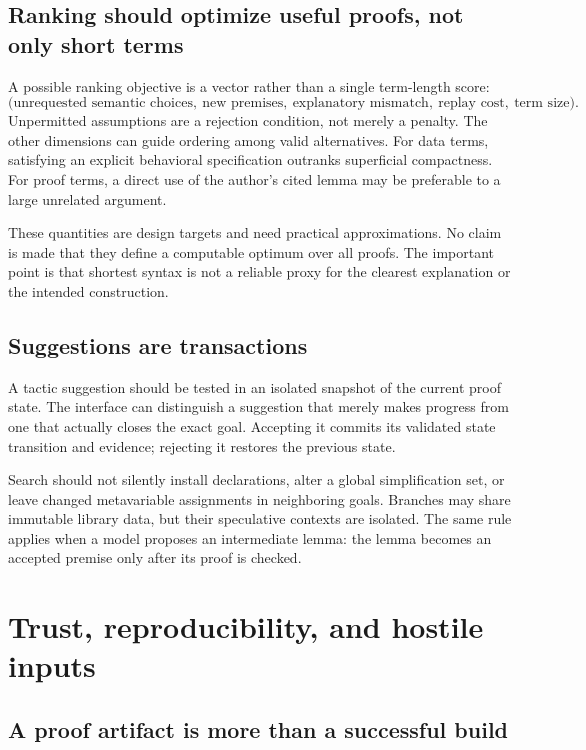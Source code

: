 \documentclass[11pt,a4paper]{article}
\theoremstyle{remark}
\begin{document}
\subsection{Ranking should optimize useful proofs, not only short terms}

A possible ranking objective is a vector rather than a single term-length score:
\[
\bigl(\text{unrequested semantic choices},\
\text{new premises},\
\text{explanatory mismatch},\
\text{replay cost},\
\text{term size}\bigr).
\]
Unpermitted assumptions are a rejection condition, not merely a penalty. The other dimensions can guide ordering among valid alternatives. For data terms, satisfying an explicit behavioral specification outranks superficial compactness. For proof terms, a direct use of the author's cited lemma may be preferable to a large unrelated argument.

These quantities are design targets and need practical approximations. No claim is made that they define a computable optimum over all proofs. The important point is that shortest syntax is not a reliable proxy for the clearest explanation or the intended construction.

\subsection{Suggestions are transactions}

A tactic suggestion should be tested in an isolated snapshot of the current proof state. The interface can distinguish a suggestion that merely makes progress from one that actually closes the exact goal. Accepting it commits its validated state transition and evidence; rejecting it restores the previous state.

Search should not silently install declarations, alter a global simplification set, or leave changed metavariable assignments in neighboring goals. Branches may share immutable library data, but their speculative contexts are isolated. The same rule applies when a model proposes an intermediate lemma: the lemma becomes an accepted premise only after its proof is checked.

\section{Trust, reproducibility, and hostile inputs}
\label{sec:trust}

\subsection{A proof artifact is more than a successful build}
\end{document}
